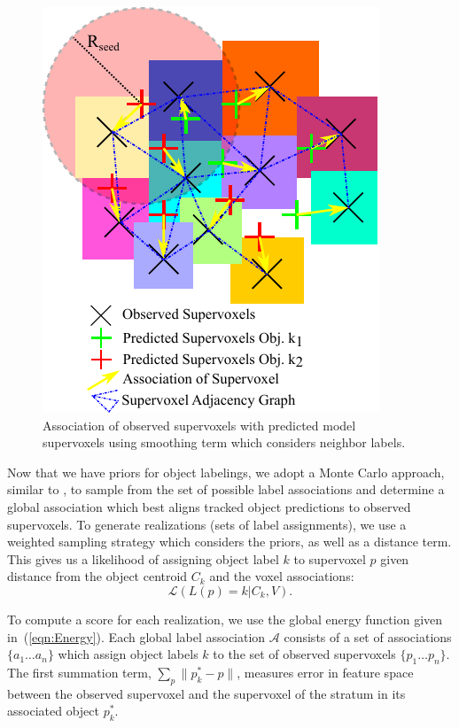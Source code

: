 \begin{figure}[tb]
  \centering
  \includegraphics[scale=1.0]{figures/IROS2013/Association.pdf}
  \caption[Supervoxel Association]{Association of observed supervoxels with predicted model supervoxels using smoothing term which considers neighbor labels.}
  \label{fig:Association}
\end{figure}

Now that we have priors for object labelings, we adopt a Monte Carlo approach, similar to \cite{EnergyBasedMultiModel}, to sample from the set of possible label associations and determine a global association which best aligns tracked object predictions to observed supervoxels. To generate realizations (sets of label assignments), we use a weighted sampling strategy which considers the priors, as well as a distance term. This gives us a likelihood of assigning object label $k$ to supervoxel $p$ given distance from the object centroid $C_k$ and the voxel associations:
\begin{equation}
 \label{eqn:WeightSampling}
 \mathcal{L}(L(p)=k | C_k, V). %
\end{equation}

To compute a score for each realization, we use the global energy function given in~(\ref{eqn:Energy}). Each global label association $\mathcal{A}$ consists of a set of associations $\{a_1 \dots a_n\}$ which assign object labels $k$ to the set of observed supervoxels $\{p_1 \dots p_n\}$. The first summation term, $ \sum_{p}{\|p^*_k - p\|} $, measures error in feature space between the observed supervoxel and the supervoxel of the stratum in its associated object $p^*_k$. 


